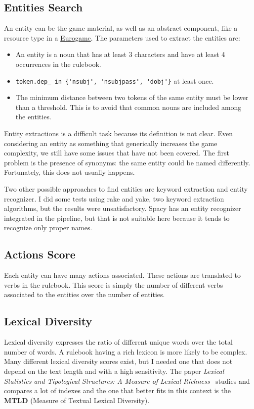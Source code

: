 \documentclass[runningheads]{llncs}
\begin{document}
\subsection{Entities Search}
An entity can be the game material, as well as an abstract component, like a resource type in a \href{https://en.wikipedia.org/wiki/Eurogame}{Eurogame}. The parameters used to extract the entities are:

\begin{itemize}
    \item An entity is a noun that has at least 3 characters and have at least 4 occurrences in the rulebook.
    \item \verb|token.dep_ in {'nsubj', 'nsubjpass', 'dobj'}| at least once.
    \item The minimum distance between two tokens of the same entity must be lower than a threshold. This is to avoid that common nouns are included among the entities.
\end{itemize}

\noindent Entity extractions is a difficult task because its definition is not clear. Even considering an entity as something that generically increases the game complexity, we still have some issues that have not been covered. The first problem is the presence of synonyms: the same entity could be named differently. Fortunately, this does not usually happens. 

Two other possible approaches to find entities are keyword extraction and entity recognizer. I did some tests using rake and yake, two keyword extraction algorithms, but the results were unsatisfactory. Spacy has an entity recognizer integrated in the pipeline, but that is not suitable here because it tends to recognize only proper names.

\subsection{Actions Score}
Each entity can have many actions associated. These actions are translated to verbs in the rulebook. This score is simply the number of different verbs associated to the entities over the number of entities. 

\subsection{Lexical Diversity}
Lexical diversity expresses the ratio of different unique words over the total number of words. A rulebook having a rich lexicon is more likely to be complex. Many different lexical diversity scores exist, but I needed one that does not depend on the text length and with a high sensitivity. 
The paper \textit{Lexical Statistics and Tipological Structures: A Measure of Lexical
Richness}~\cite{lexical_richness} studies and compares a lot of indexes and the one that better fits in this context is the \textbf{MTLD} (Measure of Textual Lexical Diversity).
\end{document}
